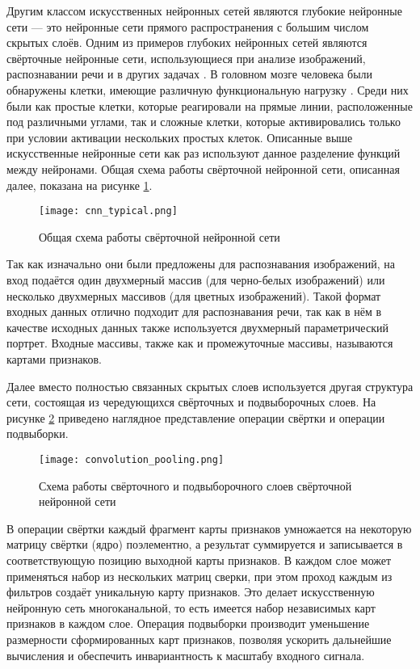 Другим классом искусственных нейронных сетей являются глубокие нейронные сети --- это нейронные сети прямого распространения с большим числом скрытых слоёв.
Одним из примеров глубоких нейронных сетей являются свёрточные нейронные сети, использующиеся при анализе изображений, распознавании речи и в других задачах \cite{lecun1995convolutional, abdel2014convolutional}.
В головном мозге человека были обнаружены клетки, имеющие различную функциональную нагрузку \cite{matsugu2003subject}.
Среди них были как простые клетки, которые реагировали на прямые линии, расположенные под различными углами, так и сложные клетки, которые активировались только при условии активации нескольких простых клеток.
Описанные выше искусственные нейронные сети как раз используют данное разделение функций между нейронами.
Общая схема работы свёрточной нейронной сети, описанная далее, показана на рисунке \ref{fig:cnn_typical}.

\begin{figure}[h]
	\centering
	\texttt{[image: cnn\_typical.png]}
	\caption{Общая схема работы свёрточной нейронной сети}
	\label{fig:cnn_typical}
\end{figure}

Так как изначально они были предложены для распознавания изображений, на вход подаётся один двухмерный массив (для черно-белых изображений) или несколько двухмерных массивов (для цветных изображений).
Такой формат входных данных отлично подходит для распознавания речи, так как в нём в качестве исходных данных также используется двухмерный параметрический портрет.
Входные массивы, также как и промежуточные массивы, называются картами признаков.

Далее вместо полностью связанных скрытых слоев используется другая структура сети, состоящая из чередующихся свёрточных и подвыборочных слоев.
На рисунке \ref{fig:convolution_pooling} приведено наглядное представление операции свёртки и операции подвыборки.

\begin{figure}[h]
	\centering
	\texttt{[image: convolution\_pooling.png]}
	\caption{Схема работы свёрточного и подвыборочного слоев свёрточной нейронной сети}
	\label{fig:convolution_pooling}
\end{figure}

В операции свёртки каждый фрагмент карты признаков умножается на некоторую матрицу свёртки (ядро) поэлементно, а результат суммируется и записывается в соответствующую позицию выходной карты признаков.
В каждом слое может применяться набор из нескольких матриц сверки, при этом проход каждым из фильтров создаёт уникальную карту признаков.
Это делает искусственную нейронную сеть многоканальной, то есть имеется набор независимых карт признаков в каждом слое.
Операция подвыборки производит уменьшение размерности сформированных карт признаков, позволяя ускорить дальнейшие вычисления и обеспечить инвариантность к масштабу входного сигнала.

